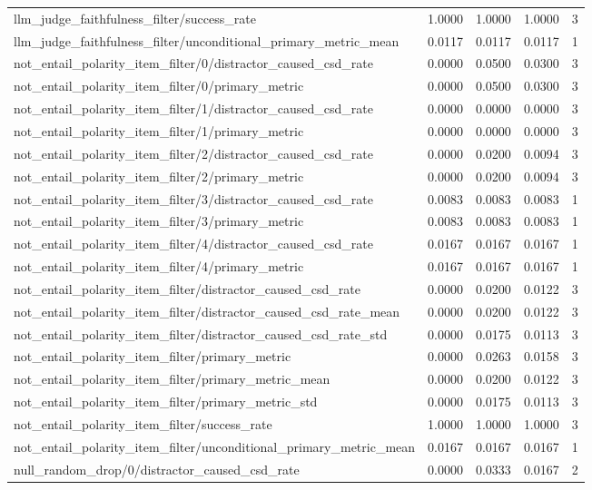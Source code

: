 \begin{table}[h]
\begin{tabular}{lrrrr}
llm_judge_faithfulness_filter/success_rate & 1.0000 & 1.0000 & 1.0000 & 3 \\
llm_judge_faithfulness_filter/unconditional_primary_metric_mean & 0.0117 & 0.0117 & 0.0117 & 1 \\
not_entail_polarity_item_filter/0/distractor_caused_csd_rate & 0.0000 & 0.0500 & 0.0300 & 3 \\
not_entail_polarity_item_filter/0/primary_metric & 0.0000 & 0.0500 & 0.0300 & 3 \\
not_entail_polarity_item_filter/1/distractor_caused_csd_rate & 0.0000 & 0.0000 & 0.0000 & 3 \\
not_entail_polarity_item_filter/1/primary_metric & 0.0000 & 0.0000 & 0.0000 & 3 \\
not_entail_polarity_item_filter/2/distractor_caused_csd_rate & 0.0000 & 0.0200 & 0.0094 & 3 \\
not_entail_polarity_item_filter/2/primary_metric & 0.0000 & 0.0200 & 0.0094 & 3 \\
not_entail_polarity_item_filter/3/distractor_caused_csd_rate & 0.0083 & 0.0083 & 0.0083 & 1 \\
not_entail_polarity_item_filter/3/primary_metric & 0.0083 & 0.0083 & 0.0083 & 1 \\
not_entail_polarity_item_filter/4/distractor_caused_csd_rate & 0.0167 & 0.0167 & 0.0167 & 1 \\
not_entail_polarity_item_filter/4/primary_metric & 0.0167 & 0.0167 & 0.0167 & 1 \\
not_entail_polarity_item_filter/distractor_caused_csd_rate & 0.0000 & 0.0200 & 0.0122 & 3 \\
not_entail_polarity_item_filter/distractor_caused_csd_rate_mean & 0.0000 & 0.0200 & 0.0122 & 3 \\
not_entail_polarity_item_filter/distractor_caused_csd_rate_std & 0.0000 & 0.0175 & 0.0113 & 3 \\
not_entail_polarity_item_filter/primary_metric & 0.0000 & 0.0263 & 0.0158 & 3 \\
not_entail_polarity_item_filter/primary_metric_mean & 0.0000 & 0.0200 & 0.0122 & 3 \\
not_entail_polarity_item_filter/primary_metric_std & 0.0000 & 0.0175 & 0.0113 & 3 \\
not_entail_polarity_item_filter/success_rate & 1.0000 & 1.0000 & 1.0000 & 3 \\
not_entail_polarity_item_filter/unconditional_primary_metric_mean & 0.0167 & 0.0167 & 0.0167 & 1 \\
null_random_drop/0/distractor_caused_csd_rate & 0.0000 & 0.0333 & 0.0167 & 2 \\

\end{tabular}
\end{table}

